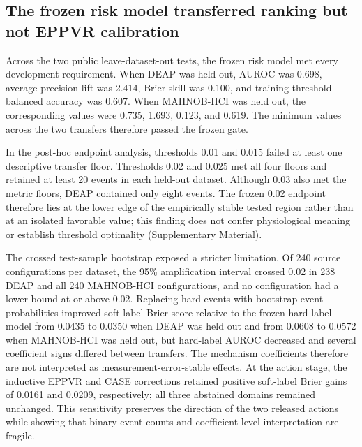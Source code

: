 \documentclass[preprint,12pt]{elsarticle}
\begin{document}
\subsection{The frozen risk model transferred ranking but not EPPVR calibration}

Across the two public leave-dataset-out tests, the frozen risk model met every development requirement. When DEAP was held out, AUROC was 0.698, average-precision lift was 2.414, Brier skill was 0.100, and training-threshold balanced accuracy was 0.607. When MAHNOB-HCI was held out, the corresponding values were 0.735, 1.693, 0.123, and 0.619. The minimum values across the two transfers therefore passed the frozen gate.

In the post-hoc endpoint analysis, thresholds 0.01 and 0.015 failed at least one descriptive transfer floor. Thresholds 0.02 and 0.025 met all four floors and retained at least 20 events in each held-out dataset. Although 0.03 also met the metric floors, DEAP contained only eight events. The frozen 0.02 endpoint therefore lies at the lower edge of the empirically stable tested region rather than at an isolated favorable value; this finding does not confer physiological meaning or establish threshold optimality (Supplementary Material).

The crossed test-sample bootstrap exposed a stricter limitation. Of 240 source configurations per dataset, the 95\% amplification interval crossed 0.02 in 238 DEAP and all 240 MAHNOB-HCI configurations, and no configuration had a lower bound at or above 0.02. Replacing hard events with bootstrap event probabilities improved soft-label Brier score relative to the frozen hard-label model from 0.0435 to 0.0350 when DEAP was held out and from 0.0608 to 0.0572 when MAHNOB-HCI was held out, but hard-label AUROC decreased and several coefficient signs differed between transfers. The mechanism coefficients therefore are not interpreted as measurement-error-stable effects. At the action stage, the inductive EPPVR and CASE corrections retained positive soft-label Brier gains of 0.0161 and 0.0209, respectively; all three abstained domains remained unchanged. This sensitivity preserves the direction of the two released actions while showing that binary event counts and coefficient-level interpretation are fragile.
\end{document}
